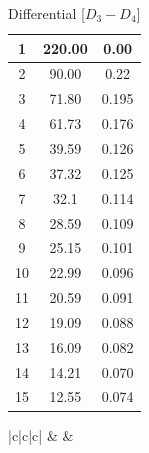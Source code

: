 \documentclass[a4paper,12pt]{article}
\begin{document}
\begin{table}[H]
\begin{subtable}[t]{0.32\textwidth}
\begin{tabular}{|c|c|c|}
			1           & 220.00         & 0.00        \\ \hline
			2           & 90.00       & 0.22        \\ \hline
			3           & 71.80       & 0.195       \\ \hline
			4           & 61.73       & 0.176       \\ \hline
			5           & 39.59       & 0.126       \\ \hline
			6           & 37.32       & 0.125       \\ \hline
			7           & 32.1        & 0.114       \\ \hline
			8           & 28.59       & 0.109       \\ \hline
			9           & 25.15       & 0.101       \\ \hline
			10          & 22.99       & 0.096       \\ \hline
			11          & 20.59       & 0.091       \\ \hline
			12          & 19.09       & 0.088       \\ \hline
			13          & 16.09       & 0.082       \\ \hline
			14          & 14.21       & 0.070       \\ \hline
			15          & 12.55       & 0.074       \\ \hline
		\end{tabular}
			\caption{Differential [$D_3-D_4$] } %
		\end{subtable}
		\hfil
		\begin{subtable}[t]{0.45\textwidth} %
			\centering
			\begin{tabular}{|c|c|c|}
			\hline
			 &  &  \\ \hline
			

\end{tabular}
\end{subtable}
\end{table}
\end{document}
